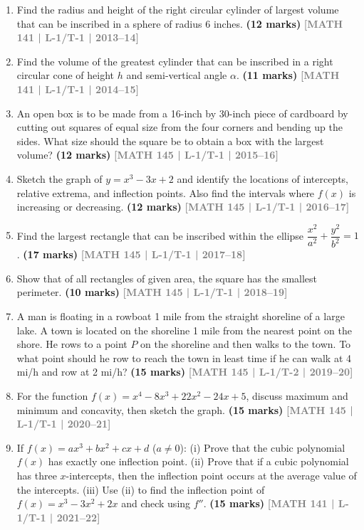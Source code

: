 \documentclass[12pt,a4paper]{article}
\newcommand{\yr}[1]{\hfill\textcolor{gray}{\small\textbf{[#1]}}}
\newcommand{\mk}[1]{\textcolor{orange!70!black}{\small\textbf{(#1 marks)}}}
\begin{document}
\begin{enumerate}
\item Find the radius and height of the right circular cylinder of largest volume that can be inscribed in a sphere of radius 6 inches.
\mk{12} \yr{MATH 141 | L-1/T-1 | 2013--14}

\item Find the volume of the greatest cylinder that can be inscribed in a right circular cone of height $h$ and semi-vertical angle $\alpha$.
\mk{11} \yr{MATH 141 | L-1/T-1 | 2014--15}

\item An open box is to be made from a 16-inch by 30-inch piece of cardboard by cutting out squares of equal size from the four corners and bending up the sides. What size should the square be to obtain a box with the largest volume?
\mk{12} \yr{MATH 145 | L-1/T-1 | 2015--16}

\item Sketch the graph of $y=x^{3}-3x+2$ and identify the locations of intercepts, relative extrema, and inflection points. Also find the intervals where $f(x)$ is increasing or decreasing.
\mk{12} \yr{MATH 145 | L-1/T-1 | 2016--17}

\item Find the largest rectangle that can be inscribed within the ellipse $\dfrac{x^{2}}{a^{2}}+\dfrac{y^{2}}{b^{2}}=1$.
\mk{17} \yr{MATH 145 | L-1/T-1 | 2017--18}

\item Show that of all rectangles of given area, the square has the smallest perimeter.
\mk{10} \yr{MATH 145 | L-1/T-1 | 2018--19}

\item A man is floating in a rowboat 1 mile from the straight shoreline of a large lake. A town is located on the shoreline 1 mile from the nearest point on the shore. He rows to a point $P$ on the shoreline and then walks to the town. To what point should he row to reach the town in least time if he can walk at 4 mi/h and row at 2 mi/h?
\mk{15} \yr{MATH 145 | L-1/T-2 | 2019--20}

\item For the function $f(x)=x^{4}-8x^{3}+22x^{2}-24x+5$, discuss maximum and minimum and concavity, then sketch the graph.
\mk{15} \yr{MATH 145 | L-1/T-1 | 2020--21}

\item If $f(x)=ax^{3}+bx^{2}+cx+d$ ($a\neq 0$): (i) Prove that the cubic polynomial $f(x)$ has exactly one inflection point. (ii) Prove that if a cubic polynomial has three $x$-intercepts, then the inflection point occurs at the average value of the intercepts. (iii) Use (ii) to find the inflection point of $f(x)=x^{3}-3x^{2}+2x$ and check using $f''$.
\mk{15} \yr{MATH 141 | L-1/T-1 | 2021--22}


\end{enumerate}
\end{document}
